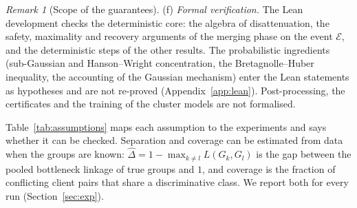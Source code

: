 \documentclass[11pt]{article}
\theoremstyle{definition}
\theoremstyle{remark}
\newtheorem{remark}{Remark}
\begin{document}
\begin{remark}[Scope of the guarantees]
(f) \emph{Formal verification.} The Lean development checks the deterministic core: the algebra of disattenuation, the safety, maximality and recovery arguments of the merging phase on the event $\mathcal E$, and the deterministic steps of the other results. The probabilistic ingredients (sub-Gaussian and Hanson--Wright concentration, the Bretagnolle--Huber inequality, the accounting of the Gaussian mechanism) enter the Lean statements as hypotheses and are not re-proved (Appendix~\ref{app:lean}). Post-processing, the certificates and the training of the cluster models are not formalised.
\end{remark}

Table~\ref{tab:assumptions} maps each assumption to the experiments and says whether it can be checked. Separation and coverage can be estimated from data when the groups are known: $\hat\Delta=1-\max_{k\neq l}L(G_k,G_l)$ is the gap between the pooled bottleneck linkage of true groups and $1$, and coverage is the fraction of conflicting client pairs that share a discriminative class. We report both for every run (Section~\ref{sec:exp}).
\end{document}
